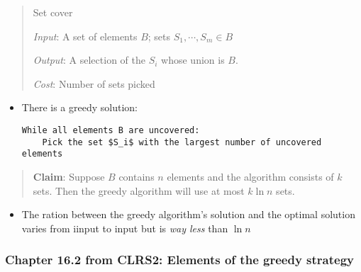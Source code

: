 \documentclass[a4paper,11pt]{article}
\begin{document}
\begin{quote}
Set cover

\emph{Input}: A set of elements $B$; sets $S_1, \cdots, S_m \in B$

\emph{Output}: A selection of the $S_i$ whose union is $B$.

\emph{Cost}: Number of sets picked
\end{quote}

\begin{itemize}
\item
  There is a greedy solution:

\begin{verbatim}
While all elements B are uncovered:
    Pick the set $S_i$ with the largest number of uncovered elements
\end{verbatim}
\end{itemize}

\begin{quote}
\textbf{Claim}: Suppose $B$ contains $n$ elements and the algorithm
consists of $k$ sets. Then the greedy algorithm will use at most
$k \ln n$ sets.
\end{quote}

\begin{itemize}
\itemsep1pt\parskip0pt
\item
  The ration between the greedy algorithm's solution and the optimal
  solution varies from iinput to input but is \emph{way less} than
  $\ln n$
\end{itemize}

\subsubsection{Chapter 16.2 from CLRS2: Elements of the greedy
strategy}\label{chapter-16.2-from-clrs2-elements-of-the-greedy-strategy}
\end{document}
